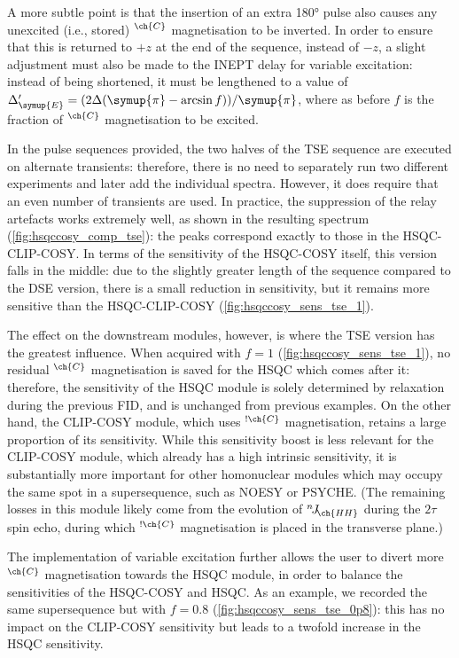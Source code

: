 \documentclass[a4paper,12pt]{article}
\newcommand{\carbon}{\ch{^{13}C}}
\newcommand{\DeltaE}{\Delta_{\symup{E}}}
\newcommand{\magn}[1]{\ch{^1H}$^{\ch{#1}}$}
\newcommand{\magnnot}[1]{\ch{^1H}$^{!\ch{#1}}$}
\newcommand{\nJ}[1]{{}^{n}\!J_{\!\ch{#1}}}
\newcommand{\cpi}{\symup{\pi}}
\begin{document}
\begin{refsection}
A more subtle point is that the insertion of an extra \carbon{} \ang{180} pulse also causes any unexcited (i.e., stored) \magn{C} magnetisation to be inverted.
In order to ensure that this is returned to $+z$ at the end of the sequence, instead of $-z$, a slight adjustment must also be made to the INEPT delay for variable excitation: instead of being shortened, it must be lengthened to a value of $\DeltaE' = (2\Delta (\cpi - \arcsin f))/\cpi$, where as before $f$ is the fraction of \magn{C} magnetisation to be excited.

In the pulse sequences provided, the two halves of the TSE sequence are executed on alternate transients: therefore, there is no need to separately run two different experiments and later add the individual spectra.
However, it does require that an even number of transients are used.
In practice, the suppression of the relay artefacts works extremely well, as shown in the resulting spectrum (\cref{fig:hsqccosy_comp_tse}): the peaks correspond exactly to those in the HSQC-CLIP-COSY.
In terms of the sensitivity of the HSQC-COSY itself, this version falls in the middle: due to the slightly greater length of the sequence compared to the DSE version, there is a small reduction in sensitivity, but it remains more sensitive than the HSQC-CLIP-COSY (\cref{fig:hsqccosy_sens_tse_1}).

The effect on the downstream modules, however, is where the TSE version has the greatest influence.
When acquired with $f = 1$ (\cref{fig:hsqccosy_sens_tse_1}), no residual \magn{C} magnetisation is saved for the HSQC which comes after it: therefore, the sensitivity of the HSQC module is solely determined by relaxation during the previous FID, and is unchanged from previous examples.
On the other hand, the CLIP-COSY module, which uses \magnnot{C} magnetisation, retains a large proportion of its sensitivity.
While this sensitivity boost is less relevant for the CLIP-COSY module, which already has a high intrinsic sensitivity, it is substantially more important for other homonuclear modules which may occupy the same spot in a supersequence, such as NOESY or PSYCHE.
(The remaining losses in this module likely come from the evolution of $\nJ{HH}$ during the $2\tau$ spin echo, during which \magnnot{C} magnetisation is placed in the transverse plane.)

The implementation of variable excitation further allows the user to divert more \magn{C} magnetisation towards the HSQC module, in order to balance the sensitivities of the HSQC-COSY and HSQC.
As an example, we recorded the same supersequence but with $f = 0.8$ (\cref{fig:hsqccosy_sens_tse_0p8}): this has no impact on the CLIP-COSY sensitivity but leads to a twofold increase in the HSQC sensitivity.


\end{refsection}
\end{document}
